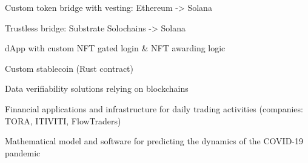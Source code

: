 

\vspace{2mm}
  \begin{cvitems} %
    \item {Custom token bridge with vesting: Ethereum -> Solana}
    \item {Trustless bridge: Substrate Solochains -> Solana}
    \item {dApp with custom NFT gated login \& NFT awarding logic}
    \item {Custom stablecoin (Rust contract)}
    \item {Data verifiability solutions relying on blockchains}
    \item {Financial applications and infrastructure for daily trading activities (companies: TORA, ITIVITI, FlowTraders)}
    \item {Mathematical model and software for predicting the dynamics of the COVID-19 pandemic}
  \end{cvitems}
  \vspace{2mm}